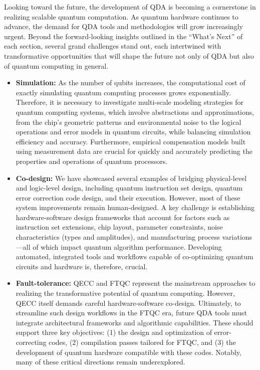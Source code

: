 \documentclass[a4paper,onecolumn,11pt,unpublished]{quantumarticle}
\begin{document}
Looking toward the future, the development of QDA is becoming a cornerstone in realizing scalable quantum computation. As quantum hardware continues to advance, the demand for QDA tools and methodologies will grow increasingly urgent. Beyond the forward-looking insights outlined in the ``What's Next'' of each section, several grand challenges stand out, each intertwined with transformative opportunities that will shape the future not only of QDA but also of quantum computing in general.
\begin{itemize}
    \item \textbf{Simulation: }As the number of qubits increases, the computational cost of exactly simulating quantum computing processes grows exponentially. Therefore, it is necessary to investigate multi-scale modeling strategies for quantum computing systems, which involve abstractions and approximations, from the chip's geometric patterns and environmental noise to the logical operations and error models in quantum circuits, while balancing simulation efficiency and accuracy. Furthermore, empirical compensation models built using measurement data are crucial for quickly and accurately predicting the properties and operations of quantum processors. 
    
    \item \textbf{Co-design: }We have showcased several examples of bridging physical-level and logic-level design, including quantum instruction set design, quantum error correction code design, and their execution. However, most of these system improvements remain human-designed. A key challenge is establishing hardware-software design frameworks that account for factors such as instruction set extensions, chip layout, parameter constraints, noise characteristics (types and amplitudes), and manufacturing process variations—all of which impact quantum algorithm performance. Developing automated, integrated tools and workflows capable of co-optimizing quantum circuits and hardware is, therefore, crucial.
    
    \item \textbf{Fault-tolerance: }QECC and FTQC represent the mainstream approaches to realizing the transformative potential of quantum computing. However, QECC itself demands careful hardware-software co-design. Ultimately, to streamline such design workflows in the FTQC era, future QDA tools must integrate architectural frameworks and algorithmic capabilities. These should support three key objectives: (1) the design and optimization of error-correcting codes, (2) compilation passes tailored for FTQC, and (3) the development of quantum hardware compatible with these codes. Notably, many of these critical directions remain underexplored.
    

\end{itemize}
\end{document}
